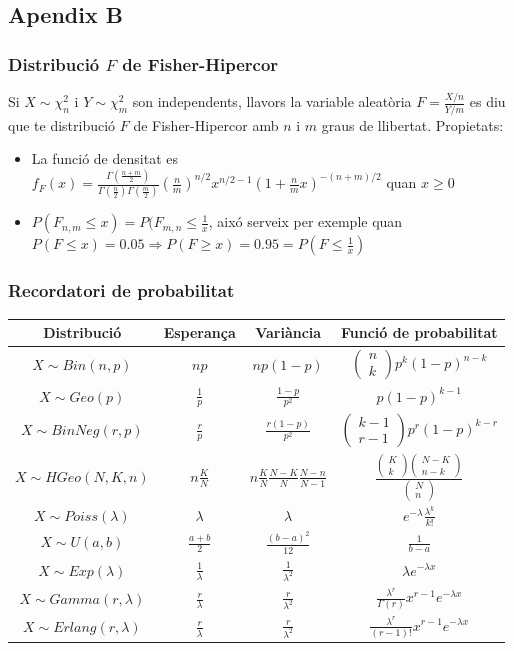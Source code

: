 \documentclass[a4paper]{sciposter}
\begin{document}
\begin{multicols}{3}
\subsection{Apendix B}
\subsubsection{Distribució $F$ de Fisher-Hipercor}
Si $X \sim \chi^2_n$ i $Y \sim \chi^2_m$ son independents, llavors la variable aleatòria $F = \frac{X/n}{Y/m}$ es diu que te distribució $F$ de Fisher-Hipercor amb $n$ i $m$ graus de llibertat.
Propietats:
\begin{itemize}
	\item La funció de densitat es\\ $f_F(x) = \frac{\Gamma(\frac{n+m}{2})}{\Gamma(\frac{n}{2})\Gamma(\frac{m}{2})}(\frac{n}{m})^{n/2}x^{n/2-1}\left(1+\frac{n}{m}x\right)^{-(n+m)/2}$ quan $x\geq 0$
	\item $P(F_{n,m}\leq x) = P(F_{m,n}\leq \frac{1}{x}$, aixó serveix per exemple quan $P(F \leq x) = 0.05 \Rightarrow P(F \geq x) = 0.95 =  P(F \leq \frac{1}{x})$
\end{itemize}
\subsubsection{Recordatori de probabilitat}
\begin{tabular}{|c|c|c|c|}
	\hline
	Distribució & Esperança & Variància & Funció de probabilitat\\
	\hline
	$X \sim Bin(n,p)$ & $np$ & $np(1-p)$ & $\left(\substack{n\\k}\right)p^k(1-p)^{n-k}$\\
	\hline
	$X \sim Geo(p)$ & $\frac{1}{p}$ & $\frac{1-p}{p^2}$ & $p(1-p)^{k-1}$\\
	\hline
	$X \sim BinNeg(r,p)$ & $\frac{r}{p}$ & $\frac{r(1-p)}{p^2}$ & $\left(\substack{k-1\\r-1}\right)p^r(1-p)^{k-r}$\\
	\hline
	$X \sim HGeo(N,K,n)$ & $n\frac{K}{N}$ & $n\frac{K}{N}\frac{N-K}{N}\frac{N-n}{N-1}$ & $\frac{\left(\substack{K\\k}\right)\left(\substack{N-K\\n-k}\right)}{\left(\substack{N\\n}\right)}$\\
	\hline
	$X \sim Poiss(\lambda)$ & $\lambda$ & $\lambda$ & $e^{-\lambda}\frac{\lambda^k}{k!}$\\
	\hline
	$X \sim U(a,b)$ & $\frac{a+b}{2}$ & $\frac{(b-a)^2}{12}$ & $\frac{1}{b-a}$\\
	\hline
	$X \sim Exp(\lambda)$ & $\frac{1}{\lambda}$ & $\frac{1}{\lambda^2}$ & $\lambda e^{-\lambda x}$\\
	\hline
	$X \sim Gamma(r, \lambda)$ & $\frac{r}{\lambda}$ & $\frac{r}{\lambda^2}$ & $\frac{\lambda^r}{\Gamma(r)}x^{r-1}e^{-\lambda x}$\\
	\hline
	$X \sim Erlang(r, \lambda)$ & $\frac{r}{\lambda}$ & $\frac{r}{\lambda^2}$ & $\frac{\lambda^r}{(r-1)!}x^{r-1}e^{-\lambda x}$\\
	\hline
\end{tabular}
\newpage

\end{multicols}
\end{document}
